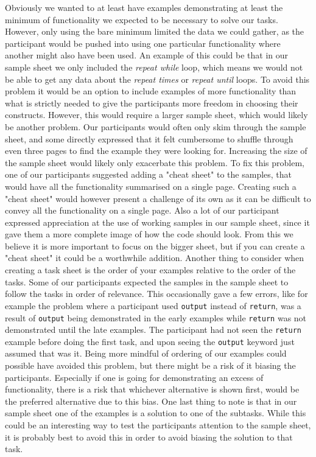 Obviously we wanted to at least have examples demonstrating at least the minimum of functionality we expected to be necessary to solve our tasks.
However, only using the bare minimum limited the data we could gather, as the participant would be pushed into using one particular functionality where another might also have been used.
An example of this could be that in our sample sheet we only included the \textit{repeat while} loop, which means we would not be able to get any data about the \textit{repeat times} or \textit{repeat until} loops.
To avoid this problem it would be an option to include examples of more functionality than what is strictly needed to give the participants more freedom in choosing their constructs.
However, this would require a larger sample sheet, which would likely be another problem.
Our participants would often only skim through the sample sheet, and some directly expressed that it felt cumbersome to shuffle through even three pages to find the example they were looking for.
Increasing the size of the sample sheet would likely only exacerbate this problem.
To fix this problem, one of our participants suggested adding a "cheat sheet" to the samples, that would have all the functionality summarised on a single page.
Creating such a "cheat sheet" would however present a challenge of its own as it can be difficult to convey all the functionality on a single page.
Also a lot of our participant expressed appreciation at the use of working samples in our sample sheet, since it gave them a more complete image of how the code should look.
From this we believe it is more important to focus on the bigger sheet, but if you can create a "cheat sheet" it could be a worthwhile addition.
Another thing to consider when creating a task sheet is the order of your examples relative to the order of the tasks.
Some of our participants expected the samples in the sample sheet to follow the tasks in order of relevance.
This occasionally gave a few errors, like for example the problem where a participant used \lstinline!output! instead of \lstinline!return!, was a result of \lstinline!output! being demonstrated in the early examples while \lstinline!return! was not demonstrated until the late examples.
The participant had not seen the \lstinline!return! example before doing the first task, and upon seeing the \lstinline!output! keyword just assumed that was it.
Being more mindful of ordering of our examples could possible have avoided this problem, but there might be a risk of it biasing the participants.
Especially if one is going for demonstrating an excess of functionality, there is a risk that whichever alternative is shown first, would be the preferred alternative due to this bias.
One last thing to note is that in our sample sheet one of the examples is a solution to one of the subtasks.
While this could be an interesting way to test the participants attention to the sample sheet, it is probably best to avoid this in order to avoid biasing the solution to that task.